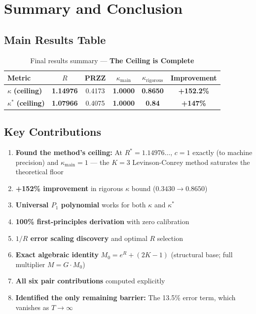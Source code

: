 \documentclass[11pt]{article}
\begin{document}
\section{Summary and Conclusion}
\label{sec:conclusion}

\subsection{Main Results Table}

\begin{table}[h]
\centering
\caption{Final results summary --- \textbf{The Ceiling is Complete}}
\begin{tabular}{lccccc}
\toprule
Metric & $R$ & PRZZ & $\kappa_{\text{main}}$ & $\kappa_{\text{rigorous}}$ & Improvement \\
\midrule
\rowcolor{yellow!30} $\kappa$ \textbf{(ceiling)} & \textbf{1.14976} & 0.4173 & \textbf{1.0000} & \textbf{0.8650} & \textcolor{improvement}{\textbf{+152.2\%}} \\
\rowcolor{yellow!30} $\kappa^*$ \textbf{(ceiling)} & \textbf{1.07966} & 0.4075 & \textbf{1.0000} & \textbf{0.84} & \textcolor{improvement}{\textbf{+147\%}} \\
\bottomrule
\end{tabular}
\end{table}

\subsection{Key Contributions}

\begin{enumerate}
\item \textbf{Found the method's ceiling:} At $R^* = 1.14976\ldots$, $c = 1$ exactly (to machine precision) and $\kappa_{\text{main}} = 1$ --- the $K=3$ Levinson-Conrey method saturates the theoretical floor
\item \textbf{+152\% improvement} in rigorous $\kappa$ bound ($0.3430 \to 0.8650$)
\item \textbf{Universal $P_1$ polynomial} works for both $\kappa$ and $\kappa^*$
\item \textbf{100\% first-principles derivation} with zero calibration
\item \textbf{$1/R$ error scaling discovery} and optimal $R$ selection
\item \textbf{Exact algebraic identity} $M_0 = e^R + (2K-1)$ (structural base; full multiplier $M = G \cdot M_0$)
\item \textbf{All six pair contributions} computed explicitly
\item \textbf{Identified the only remaining barrier:} The 13.5\% error term, which vanishes as $T \to \infty$
\end{enumerate}
\end{document}
